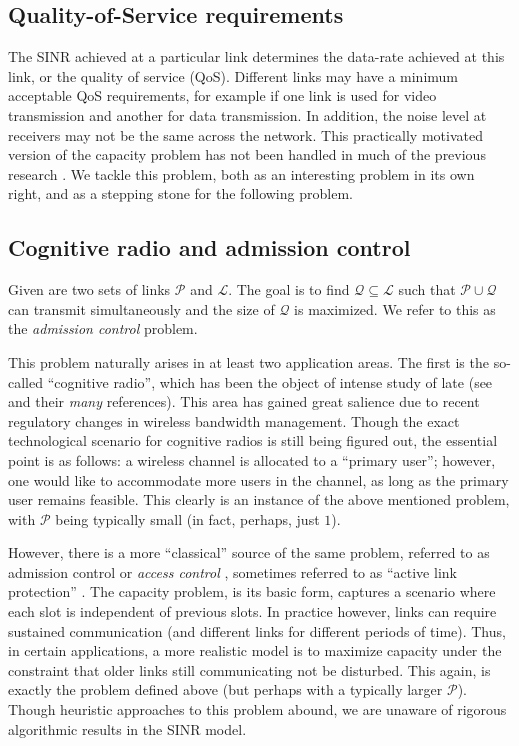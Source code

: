 \documentclass[11pt]{amsart}
\def\calL{{\mathcal L}}
\def\calP{{\mathcal P}}
\def\calQ{{\mathcal Q}}
\begin{document}
\subsection*{Quality-of-Service requirements}

The SINR achieved at a particular link determines the data-rate achieved at this link, or the quality of service (QoS). Different links may have a minimum acceptable QoS requirements, for example if one link is used for video transmission and another for data transmission. In addition, the noise level at receivers may not be the same across the network. This practically motivated version of the capacity problem has not been handled in much of the previous research \cite{GHWW09,HW09,SODA11}.
We tackle this problem, both as an interesting problem in its own right, and as a stepping stone for the following problem.


\subsection*{Cognitive radio and admission control}
Given are two sets of links $\calP$ and $\calL$. The goal is to find  $\calQ \subseteq \calL$ such that $\calP \cup \calQ$ can transmit simultaneously and the size of $\calQ$ is maximized.  We refer to this as the \emph{admission control} problem.

This problem naturally arises in at least two application areas. The first is the so-called ``cognitive radio'', which has been the object of intense study of late (see \cite{Bahl:2009:WSN:1592568.1592573,SuZhangCognitive,Levorato:2009:CIM:1793974.1793991} and their \emph{many} references). This area has gained great salience due to recent 
regulatory changes in wireless bandwidth management. Though the exact technological scenario for cognitive radios is still being figured out, the essential point is as follows: a wireless channel is allocated to a ``primary user''; however, one would like to accommodate more users in the channel, as long as the primary user remains feasible. 
This clearly is an instance of the above mentioned problem, with  $\calP$ being typically small (in fact, perhaps, just $1$).

However, there is a more ``classical'' source of the same problem, referred to as admission control or \emph{access control} \cite{GoldsmithSurvey,WuBertsekas}, sometimes referred to as ``active link protection'' \cite{ChiangSurvey}. The capacity problem, is its basic form, captures a scenario where each slot is independent of previous slots. In practice however, links can require sustained communication (and different links for different periods of time). Thus, in certain applications, a more realistic model is to maximize capacity under the constraint that older links still communicating not be disturbed. This again, is exactly the problem defined above (but perhaps with a typically larger $\calP$). Though heuristic approaches to this problem abound, we are unaware of rigorous algorithmic
results in the SINR model.
\end{document}
